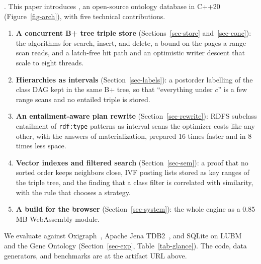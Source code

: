 .
This paper introduces \sys, an open-source ontology database in C++20
(Figure~\ref{fig-arch}), with five technical contributions.
\begin{enumerate}
\item \textbf{A concurrent B+ tree triple store} (Sections~\ref{sec-store}
  and~\ref{sec-conc}): the algorithms for search, insert, and delete, a bound
  on the pages a range scan reads, and a latch-free hit path and an optimistic
  writer descent that scale to eight threads.
\item \textbf{Hierarchies as intervals} (Section~\ref{sec-labels}): a postorder
  labelling of the class DAG kept in the same B+ tree, so that ``everything
  under $c$'' is a few range scans and no entailed triple is stored.
\item \textbf{An entailment-aware plan rewrite} (Section~\ref{sec-rewrite}):
  RDFS subclass entailment of \texttt{rdf:type} patterns as interval scans the
  optimizer costs like any other, with the answers of materialization, prepared
  16 times faster and in 8 times less space.
\item \textbf{Vector indexes and filtered search} (Section~\ref{sec-sem}): a
  proof that no sorted order keeps neighbors close, IVF posting lists stored as
  key ranges of the triple tree, and the finding that a class filter is
  correlated with similarity, with the rule that chooses a strategy.
\item \textbf{A build for the browser} (Section~\ref{sec-system}): the whole
  engine as a 0.85\,MB WebAssembly module.
\end{enumerate}
We evaluate \sys against Oxigraph~\cite{oxigraph}, Apache Jena
TDB2~\cite{jenatdb}, and SQLite on LUBM~\cite{lubm} and the Gene Ontology
(Section~\ref{sec-exp}, Table~\ref{tab-glance}).
The code, data generators, and benchmarks are at the artifact URL above.
